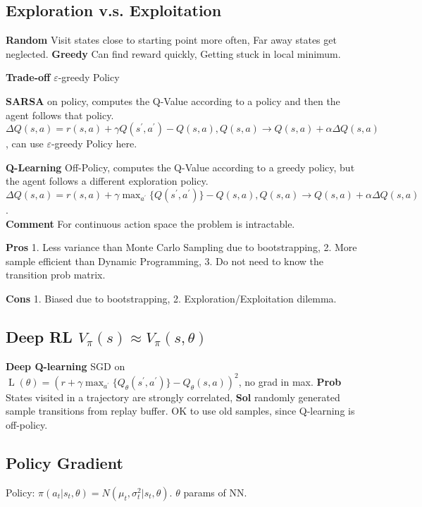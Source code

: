 \subsection*{Exploration v.s. Exploitation}
\textbf{Random} Visit states close to starting point more often, Far away states get neglected.
\textbf{Greedy} Can find reward quickly, Getting stuck in local minimum.

\textbf{Trade-off} \(\varepsilon\)-greedy Policy

\textbf{SARSA} on policy, computes the Q-Value according to a policy and then the agent follows that policy. 
% 
\(\Delta Q(s, a)=r(s, a)+\gamma Q(s^{\prime}, a^{\prime})-Q(s, a), Q(s, a) \to Q(s, a)+\alpha \Delta Q(s, a) \), can use  \(\varepsilon\)-greedy Policy here.

\textbf{Q-Learning} Off-Policy, computes the Q-Value according to a greedy policy, but the agent follows a different exploration policy. 
% 
\(\Delta Q(s, a) = r(s, a)+\gamma \max _{a^{\prime}}\{Q(s^{\prime}, a^{\prime})\}-Q(s, a), Q(s, a) \to Q(s, a)+\alpha \Delta Q(s, a)\).\\
% 
\textbf{Comment} For continuous action space the problem is intractable.

\textbf{Pros} 
1. Less variance than Monte Carlo Sampling due to bootstrapping,
2. More sample efficient than Dynamic Programming,
3. Do not need to know the transition prob matrix.

\textbf{Cons}
1. Biased due to bootstrapping,
2. Exploration/Exploitation dilemma.

\subsection*{Deep RL \(V_{\pi}(s) \approx V_{\pi}(s, \theta)\)}

\textbf{Deep Q-learning} SGD on \(\operatorname{L}(\theta)=(r+\gamma \max _{a^{\prime}} \{Q_{\theta}(s^{\prime}, a^{\prime})\}-Q_{\theta}(s, a))^{2}\), no grad in max. 
% 
\textbf{Prob} States visited in a trajectory are strongly correlated, \textbf{Sol} randomly generated sample transitions from replay buffer. 
% 
OK to use old samples, since Q-learning is off-policy.


\subsection*{Policy Gradient}

Policy: \(\pi(a_{t} | s_{t}, \theta )=N(\mu_{t}, \sigma_{t}^{2} | s_{t}, \theta)\). \(\theta\) params of NN.

